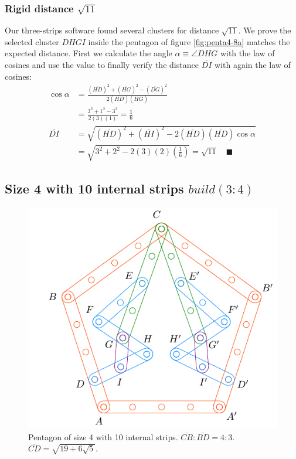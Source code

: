 \documentclass[11pt]{article}
\begin{document}
\subsubsection{Rigid distance $\sqrt{11}$}

Our three-strips software found several clusters for distance $\sqrt{11}$. We prove the selected cluster $DHGI$ inside the pentagon of figure \ref{fig:penta4-8a} matches the expected distance. First we calculate the angle $\alpha \equiv \angle{DHG}$ with the law of cosines and use the value to finally verify the distance $\overline{DI}$ with again the law of cosines:
\begin{align}
\cos\alpha &= \frac{(\overline{HD})^2 + (\overline{HG})^2 - (\overline{DG})^2}
 {2(\overline{HD})(\overline{HG})} \nonumber\\
 &= \frac{3^2 + 1^2 - 3^2}{2(3)(1)} = \frac{1}6 \\
\overline{DI} &= \sqrt{(\overline{HD})^2 + (\overline{HI})^2
 - 2(\overline{HD})(\overline{HD})\cos\alpha} \nonumber\\
 &= \sqrt{3^2 + 2^2 - 2(3)(2)\left(\frac{1}6\right)} = \sqrt{11} \quad\blacksquare
\end{align}

\subsection{Size 4 with 10 internal strips $build(3:4)$}

\begin{figure}[H]
\centering
\includegraphics[scale=1.1]{4/penta4-10a}
\caption{Pentagon of size 4 with 10 internal strips. $\overline{CB} : \overline{BD} = 4:3$. $\overline{CD} = \sqrt{19 + 6\sqrt5}$.}
\label{fig:penta4-10a}
\end{figure}
\end{document}

